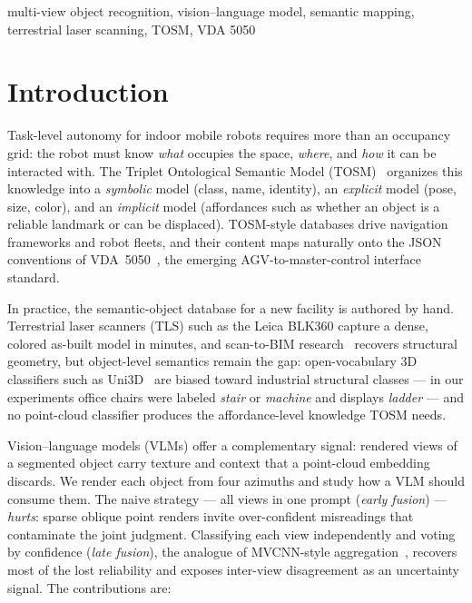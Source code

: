 \documentclass[conference]{IEEEtran}
\begin{document}
\begin{IEEEkeywords}
multi-view object recognition, vision--language model, semantic mapping,
terrestrial laser scanning, TOSM, VDA 5050
\end{IEEEkeywords}

\section{Introduction}
Task-level autonomy for indoor mobile robots requires more than an
occupancy grid: the robot must know \emph{what} occupies the space,
\emph{where}, and \emph{how} it can be interacted with. The
Triplet Ontological Semantic Model (TOSM)~\cite{joo2020tosm} organizes this
knowledge into a \emph{symbolic} model (class, name, identity), an
\emph{explicit} model (pose, size, color), and an \emph{implicit} model
(affordances such as whether an object is a reliable landmark or can be
displaced). TOSM-style databases drive navigation frameworks and robot fleets, and
their content maps naturally onto the JSON conventions of
VDA~5050~\cite{vda5050}, the emerging AGV-to-master-control interface
standard.

In practice, the semantic-object database for a new facility is authored
by hand. Terrestrial laser scanners (TLS) such as the Leica BLK360 capture
a dense, colored as-built model in minutes, and scan-to-BIM
research~\cite{patraucean2015} recovers structural geometry, but
object-level semantics remain the gap: open-vocabulary 3D classifiers
such as Uni3D~\cite{zhou2024uni3d} are biased toward industrial structural
classes --- in our experiments office chairs were labeled \emph{stair} or
\emph{machine} and displays \emph{ladder} --- and no point-cloud classifier
produces the affordance-level knowledge TOSM needs.

Vision--language models (VLMs) offer a complementary signal: rendered views
of a segmented object carry texture and context that a point-cloud embedding
discards. We render each object from four azimuths and study how a VLM
should consume them. The naive strategy --- all views in one prompt
(\emph{early fusion}) --- \emph{hurts}: sparse oblique point renders
invite over-confident misreadings that contaminate the joint judgment.
Classifying each view independently and voting by confidence
(\emph{late fusion}), the analogue of MVCNN-style
aggregation~\cite{su2015mvcnn}, recovers most of the lost reliability and
exposes inter-view disagreement as an uncertainty signal. The contributions are:
\end{document}

